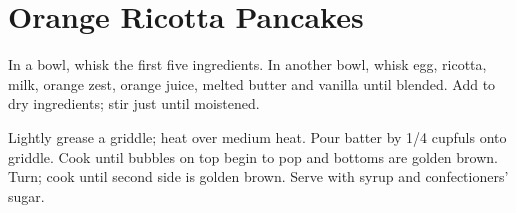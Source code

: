 \section{Orange Ricotta Pancakes}
\begin{recipe}
	
	
	
	
	
	
	In a bowl, whisk the first five ingredients. In another bowl, whisk egg, ricotta, milk, orange zest, orange juice, melted butter and vanilla until blended. Add to dry ingredients; stir just until moistened.
	
	Lightly grease a griddle; heat over medium heat. Pour batter by 1/4 cupfuls onto griddle. Cook until bubbles on top begin to pop and bottoms are golden brown. Turn; cook until second side is golden brown. Serve with syrup and confectioners' sugar.
	
	
	
	
\end{recipe}

